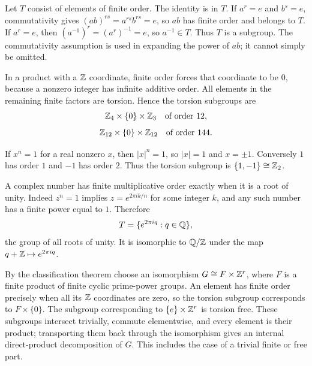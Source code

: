 Let $T$ consist of elements of finite order. The identity is in $T$. If $a^r=e$ and $b^s=e$, commutativity gives $(ab)^{rs}=a^{rs}b^{rs}=e$, so $ab$ has finite order and belongs to $T$. If $a^r=e$, then $(a^{-1})^r=(a^r)^{-1}=e$, so $a^{-1}\in T$. Thus $T$ is a subgroup. The commutativity assumption is used in expanding the power of $ab$; it cannot simply be omitted.

In a product with a $\mathbb{Z}$ coordinate, finite order forces that coordinate to be $0$, because a nonzero integer has infinite additive order. All elements in the remaining finite factors are torsion. Hence the torsion subgroups are
\[\mathbb{Z}_4\times\{0\}\times\mathbb{Z}_3\quad\text{of order }12,\]
\[\mathbb{Z}_{12}\times\{0\}\times\mathbb{Z}_{12}\quad\text{of order }144.\]

If $x^n=1$ for a real nonzero $x$, then $|x|^n=1$, so $|x|=1$ and $x=\pm1$. Conversely $1$ has order $1$ and $-1$ has order $2$. Thus the torsion subgroup is $\{1,-1\}\cong\mathbb{Z}_2$.

A complex number has finite multiplicative order exactly when it is a root of unity. Indeed $z^n=1$ implies $z=e^{2\pi i k/n}$ for some integer $k$, and any such number has a finite power equal to $1$. Therefore
\[T=\{e^{2\pi i q}:q\in\mathbb{Q}\},\]
the group of all roots of unity. It is isomorphic to $\mathbb{Q}/\mathbb{Z}$ under the map $q+\mathbb{Z}\mapsto e^{2\pi iq}$.

By the classification theorem choose an isomorphism $G\cong F\times\mathbb{Z}^r$, where $F$ is a finite product of finite cyclic prime-power groups. An element has finite order precisely when all its $\mathbb{Z}$ coordinates are zero, so the torsion subgroup corresponds to $F\times\{0\}$. The subgroup corresponding to $\{e\}\times\mathbb{Z}^r$ is torsion free. These subgroups intersect trivially, commute elementwise, and every element is their product; transporting them back through the isomorphism gives an internal direct-product decomposition of $G$. This includes the case of a trivial finite or free part.

